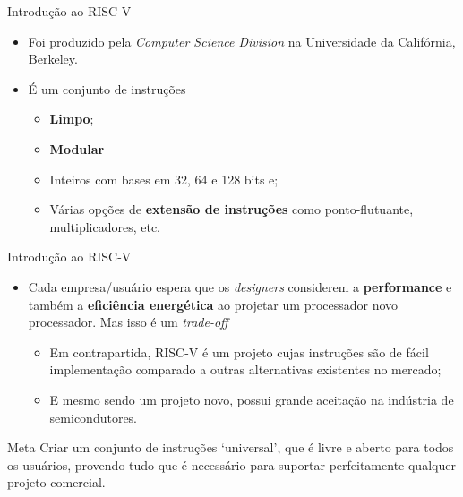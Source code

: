 \documentclass[red, aspectratio=169, xcolor=dvipsnames]{beamer}
\let\olditem=\item%
\renewcommand{\item}{\olditem \justifying}
\begin{document}
\begin{frame}{Introdução ao RISC-V}
	\begin{itemize}
		\setlength{\itemsep}{1em}
		\item Foi produzido pela \textit{Computer Science Division} na Universidade da Califórnia, Berkeley.

		\item É um conjunto de instruções
		\begin{itemize}
			\item \textbf{Limpo};
			\item \textbf{Modular}
			\item Inteiros com bases em 32, 64 e 128 bits e;
			\item Várias opções de \textbf{extensão de instruções} como ponto-flutuante, multiplicadores, etc.
		\end{itemize}
	\end{itemize}
\end{frame}


\begin{frame}{Introdução ao RISC-V}
	\begin{itemize}
		\setlength{\itemsep}{1em}
		
		\item Cada empresa/usuário espera que os \textit{designers} considerem a \textbf{performance} e também a \textbf{eficiência energética} ao projetar um processador novo processador. Mas isso é um \textit{trade-off}
		\begin{itemize}
			\item Em contrapartida, RISC-V é um projeto cujas instruções são de fácil implementação comparado a outras alternativas existentes no mercado;
			\item E mesmo sendo um projeto novo, possui grande aceitação na indústria de semicondutores.
		\end{itemize}
	\end{itemize}

	\begin{block}{Meta}
		 Criar um conjunto de instruções `universal', que é livre e aberto para todos os usuários, provendo tudo que é necessário para suportar perfeitamente qualquer projeto comercial.
	\end{block}
\end{frame}
\end{document}

